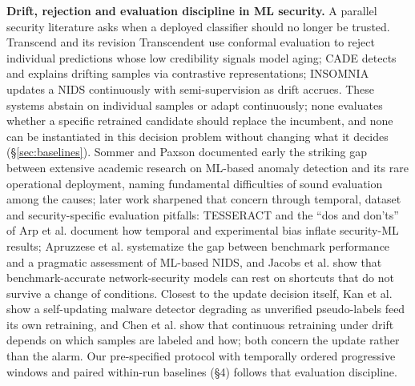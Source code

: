 \documentclass[journal]{IEEEtran}
\begin{document}
\textbf{Drift, rejection and evaluation discipline in ML security.} A parallel security literature asks when a deployed classifier should no longer be trusted. Transcend \cite{jordaney2017transcend} and its revision Transcendent \cite{barbero2022transcendent} use conformal evaluation to reject individual predictions whose low credibility signals model aging; CADE \cite{yang2021cade} detects and explains drifting samples via contrastive representations; INSOMNIA \cite{andresini2021insomnia} updates a NIDS continuously with semi-supervision as drift accrues. These systems abstain on individual samples or adapt continuously; none evaluates whether a specific retrained candidate should replace the incumbent, and none can be instantiated in this decision problem without changing what it decides (\S\ref{sec:baselines}). Sommer and Paxson \cite{sommer2010outside} documented early the striking gap between extensive academic research on ML-based anomaly detection and its rare operational deployment, naming fundamental difficulties of sound evaluation among the causes; later work sharpened that concern through temporal, dataset and security-specific evaluation pitfalls: TESSERACT \cite{pendlebury2019tesseract} and the ``dos and don'ts'' of Arp et al. \cite{arp2022dodonts} document how temporal and experimental bias inflate security-ML results; Apruzzese et al. \cite{apruzzese2023sok} systematize the gap between benchmark performance and a pragmatic assessment of ML-based NIDS, and Jacobs et al. \cite{jacobs2022emperor} show that benchmark-accurate network-security models can rest on shortcuts that do not survive a change of conditions. Closest to the update decision itself, Kan et al. \cite{kan2021labelless} show a self-updating malware detector degrading as unverified pseudo-labels feed its own retraining, and Chen et al. \cite{chen2023continuous} show that continuous retraining under drift depends on which samples are labeled and how; both concern the update rather than the alarm. Our pre-specified protocol with temporally ordered progressive windows and paired within-run baselines (\S4) follows that evaluation discipline.
\end{document}
